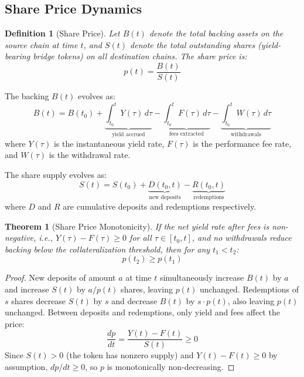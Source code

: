 \documentclass[11pt,twocolumn]{article}
\newtheorem{theorem}{Theorem}[section]
\newtheorem{definition}{Definition}[section]
\begin{document}
\subsection{Share Price Dynamics}

\begin{definition}[Share Price]
Let $B(t)$ denote the total backing assets on the source chain at time $t$, and $S(t)$ denote the total outstanding shares (yield-bearing bridge tokens) on all destination chains. The share price is:
\begin{equation}\label{eq:shareprice}
  p(t) = \frac{B(t)}{S(t)}
\end{equation}
\end{definition}

The backing $B(t)$ evolves as:
\begin{equation}\label{eq:backing}
  B(t) = B(t_0) + \underbrace{\int_{t_0}^{t} Y(\tau)\,d\tau}_{\text{yield accrued}} - \underbrace{\int_{t_0}^{t} F(\tau)\,d\tau}_{\text{fees extracted}} - \underbrace{\int_{t_0}^{t} W(\tau)\,d\tau}_{\text{withdrawals}}
\end{equation}
where $Y(\tau)$ is the instantaneous yield rate, $F(\tau)$ is the performance fee rate, and $W(\tau)$ is the withdrawal rate.

The share supply evolves as:
\begin{equation}\label{eq:supply}
  S(t) = S(t_0) + \underbrace{D(t_0, t)}_{\text{new deposits}} - \underbrace{R(t_0, t)}_{\text{redemptions}}
\end{equation}
where $D$ and $R$ are cumulative deposits and redemptions respectively.

\begin{theorem}[Share Price Monotonicity]\label{thm:monotone}
If the net yield rate after fees is non-negative, i.e., $Y(\tau) - F(\tau) \geq 0$ for all $\tau \in [t_0, t]$, and no withdrawals reduce backing below the collateralization threshold, then for any $t_1 < t_2$:
\begin{equation}
  p(t_2) \geq p(t_1)
\end{equation}
\end{theorem}

\begin{proof}
New deposits of amount $a$ at time $t$ simultaneously increase $B(t)$ by $a$ and increase $S(t)$ by $a/p(t)$ shares, leaving $p(t)$ unchanged. Redemptions of $s$ shares decrease $S(t)$ by $s$ and decrease $B(t)$ by $s \cdot p(t)$, also leaving $p(t)$ unchanged. Between deposits and redemptions, only yield and fees affect the price:
\begin{equation}
  \frac{dp}{dt} = \frac{Y(t) - F(t)}{S(t)} \geq 0
\end{equation}
Since $S(t) > 0$ (the token has nonzero supply) and $Y(t) - F(t) \geq 0$ by assumption, $dp/dt \geq 0$, so $p$ is monotonically non-decreasing.
\end{proof}
\end{document}

